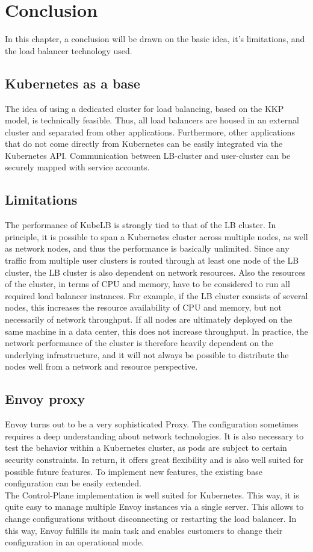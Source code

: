 \chapter{Conclusion}

In this chapter, a conclusion will be drawn on the basic idea, it's limitations, and the load balancer technology used.

\section{Kubernetes as a base}
The idea of using a dedicated cluster for load balancing, based on the KKP model, is technically feasible.
Thus, all load balancers are housed in an external cluster and separated from other applications.
Furthermore, other applications that do not come directly from Kubernetes can be easily integrated via the Kubernetes API.
Communication between LB-cluster and user-cluster can be securely mapped with service accounts.

\section{Limitations}
The performance of KubeLB is strongly tied to that of the LB cluster.
In principle, it is possible to span a Kubernetes cluster across multiple nodes, as well as network nodes, and thus the performance is basically unlimited.
Since any traffic from multiple user clusters is routed through at least one node of the LB cluster, the LB cluster is also dependent on network resources.
Also the resources of the cluster, in terms of CPU and memory, have to be considered to run all required load balancer instances.
For example, if the LB cluster consists of several nodes, this increases the resource availability of CPU and memory, but not necessarily of network throughput.
If all nodes are ultimately deployed on the same machine in a data center, this does not increase throughput.
In practice, the network performance of the cluster is therefore heavily dependent on the underlying infrastructure, and it will not always be possible to distribute the nodes well from a network and resource perspective.

\section{Envoy proxy}
Envoy turns out to be a very sophisticated Proxy.
The configuration sometimes requires a deep understanding about network technologies.
It is also necessary to test the behavior within a Kubernetes cluster, as pods are subject to certain security constraints.
In return, it offers great flexibility and is also well suited for possible future features.
To implement new features, the existing base configuration can be easily extended.
\\
The Control-Plane implementation is well suited for Kubernetes.
This way, it is quite easy to manage multiple Envoy instances via a single server.
This allows to change configurations without disconnecting or restarting the load balancer.
In this way, Envoy fulfills its main task and enables customers to change their configuration in an operational mode.
